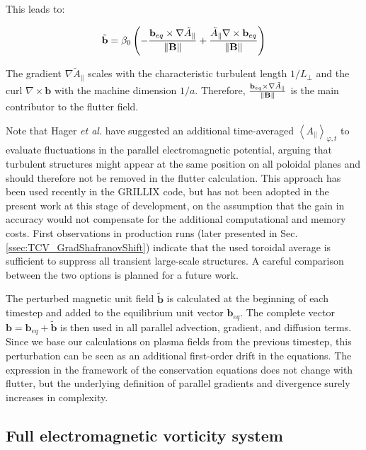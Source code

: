 This leads to: 

\begin{equation}
	\tilde{\mathbf{b}} = \beta_0 \left(- \frac{\mathbf{b}_{eq} \times \nabla \tilde{A}_\parallel}{\norm{\mathbf{B}}} + \frac{\tilde{A}_\parallel \nabla \times \mathbf{b}_{eq}}{\norm{\mathbf{B}}}\right)
	\label{eq:definitionMagneticFieldWithFlutter_1}
\end{equation}

The gradient $\nabla \tilde{A}_\parallel$ scales with the characteristic turbulent length $1/L_\perp$ and the curl $\nabla \times \mathbf{b}$ with the machine dimension $1/a$. Therefore, $\frac{\mathbf{b}_{eq} \times \nabla \tilde{A}_\parallel}{\norm{\mathbf{B}}}$ is the main contributor to the flutter field.

Note that Hager \emph{et al.}\cite{hager2022} have suggested an additional time-averaged $\left<A_\parallel\right>_{\varphi,t}$ to evaluate fluctuations in the parallel electromagnetic potential, arguing that turbulent structures might appear at the same position on all poloidal planes and should therefore not be removed in the flutter calculation. This approach has been used recently  in the GRILLIX code\cite{zhang2024}, but has not been adopted in the present work at this stage of development, on the assumption that the gain in accuracy would not compensate for the additional computational and memory costs. First observations in production runs (later presented in Sec. \ref{ssec:TCV_GradShafranovShift}) indicate that the used toroidal average is sufficient to suppress all transient large-scale structures. A careful comparison between the two options is planned for a future work. 

The perturbed magnetic unit field $\tilde{\mathbf{b}}$ is calculated at the beginning of each timestep and added to the equilibrium unit vector $\mathbf{b}_{eq}$. The complete vector $\mathbf{b} = \mathbf{b}_{eq} + \tilde{\mathbf{b}}$ is then used in all parallel advection, gradient, and diffusion terms. Since we base our calculations on plasma fields from the previous timestep, this perturbation can be seen as an additional first-order drift in the equations. The expression in the framework of the conservation equations does not change with flutter, but the underlying definition of parallel gradients and divergence surely increases in complexity. \\


\subsection{Full electromagnetic vorticity system}
\label{sec:S3X_formulationEMsystem}



